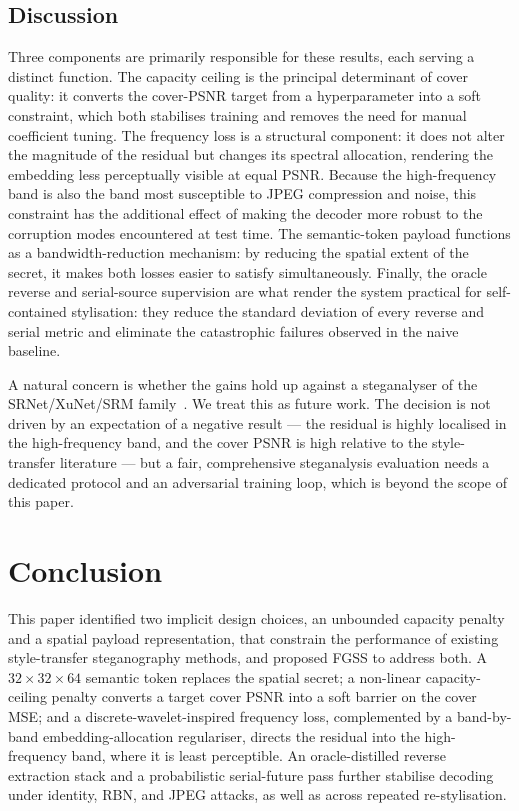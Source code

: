 \documentclass[runningheads]{llncs}
\begin{document}
\subsection{Discussion}
Three components are primarily responsible for these results, each serving a distinct function. The capacity ceiling is the principal determinant of cover quality: it converts the cover-PSNR target from a hyperparameter into a soft constraint, which both stabilises training and removes the need for manual coefficient tuning. The frequency loss is a structural component: it does not alter the magnitude of the residual but changes its spectral allocation, rendering the embedding less perceptually visible at equal PSNR. Because the high-frequency band is also the band most susceptible to JPEG compression and noise, this constraint has the additional effect of making the decoder more robust to the corruption modes encountered at test time. The semantic-token payload functions as a bandwidth-reduction mechanism: by reducing the spatial extent of the secret, it makes both losses easier to satisfy simultaneously. Finally, the oracle reverse and serial-source supervision are what render the system practical for self-contained stylisation: they reduce the standard deviation of every reverse and serial metric and eliminate the catastrophic failures observed in the naive baseline.

A natural concern is whether the gains hold up against a steganalyser of the SRNet/XuNet/SRM family~\cite{srnet,xunet,srm}. We treat this as future work. The decision is not driven by an expectation of a negative result --- the residual is highly localised in the high-frequency band, and the cover PSNR is high relative to the style-transfer literature --- but a fair, comprehensive steganalysis evaluation needs a dedicated protocol and an adversarial training loop, which is beyond the scope of this paper.

\section{Conclusion}
This paper identified two implicit design choices, an unbounded capacity penalty and a spatial payload representation, that constrain the performance of existing style-transfer steganography methods, and proposed FGSS to address both. A $32\!\times\!32\!\times\!64$ semantic token replaces the spatial secret; a non-linear capacity-ceiling penalty converts a target cover PSNR into a soft barrier on the cover MSE; and a discrete-wavelet-inspired frequency loss, complemented by a band-by-band embedding-allocation regulariser, directs the residual into the high-frequency band, where it is least perceptible. An oracle-distilled reverse extraction stack and a probabilistic serial-future pass further stabilise decoding under identity, RBN, and JPEG attacks, as well as across repeated re-stylisation.
\end{document}
